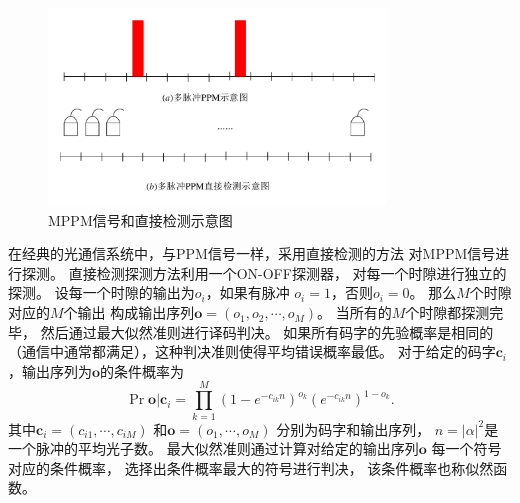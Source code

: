 \begin{figure}
\centering
  \includegraphics[width=0.8\textwidth]{figures/chap4/MPPM-DD}
  \caption{MPPM信号和直接检测示意图}
  \label{fig:MPPM-DD}
\end{figure}

在经典的光通信系统中，与PPM信号一样，采用直接检测的方法
对MPPM信号进行探测\cite{simon2003multi}。
直接检测探测方法利用一个ON-OFF探测器，
对每一个时隙进行独立的探测。
设每一个时隙的输出为$o_i$，如果有脉冲
$o_i=1$，否则$o_i=0$。
那么$M$个时隙对应的$M$个输出
构成输出序列$\bm{o} = (o_1,o_2,\cdots,o_M)$。
当所有的$M$个时隙都探测完毕，
然后通过最大似然准则进行译码判决\cite{simon2003multi}。
如果所有码字的先验概率是相同的（通信中通常都满足），这种判决准则使得平均错误概率最低。
对于给定的码字$\bm{c}_i$，输出序列为$\bm{o}$的条件概率为
\begin{equation}
\Pr{\bm{o} | \bm{c}_i} = \prod_{k=1}^M \left(1 - e^{-c_{ik}n} \right)^{o_{k}} \left(e^{-c_{ik}n} \right)^{1-o_{k}} .
\end{equation}
其中$\bm{c}_i=(c_{i1},\cdots,c_{iM})$
和$\bm{o}=(o_{1},\cdots,o_{M})$
分别为码字和输出序列，
$n=|\alpha|^2$是一个脉冲的平均光子数。
最大似然准则通过计算对给定的输出序列$\bm{o}$
每一个符号对应的条件概率，
选择出条件概率最大的符号进行判决，
该条件概率也称似然函数。

